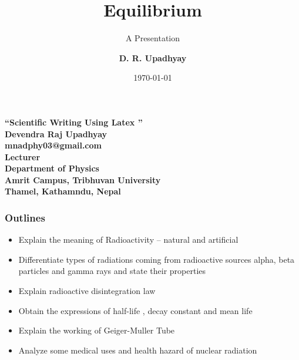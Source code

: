 \documentclass{beamer}
\author{\bf{D. R. Upadhyay}}
\institute{Amrit Campus,TU}
\title[SSTUL]{\Huge\bf{Equilibrium
	}}
\subtitle{A Presentation}
\date{\today}
\begin{document}
		\begin{frame}
			\begin{center}
				{\Huge\bf{\color{red}``Scientific Writing Using Latex
					''}\\[0.5cm]}
				\LARGE\bf{Devendra Raj Upadhyay}
				\\mnadphy03@gmail.com\\Lecturer\\ Department of Physics\\ Amrit Campus, Tribhuvan University\\
				Thamel, Kathamndu, Nepal\\
			\end{center}
		\end{frame}
		
			\begin{frame}		
				\frametitle{\bf Outlines}
				\begin{itemize}
				\bf \color{red}	\item Explain the meaning of Radioactivity – natural and artificial
						\bf \color{blue} \item Differentiate types of radiations coming from radioactive sources alpha, beta particles and gamma rays and state their properties
					\bf \color{red}	\item Explain radioactive disintegration law
					\bf \color{blue}	\item Obtain the expressions of half-life , decay constant and mean life
						\bf \color{red} \item Explain the working of Geiger-Muller Tube
					\bf \color{blue}	\item Analyze some medical uses and health hazard of nuclear radiation
						
				\end{itemize}	
			\end{frame}
		
					
\end{document}
